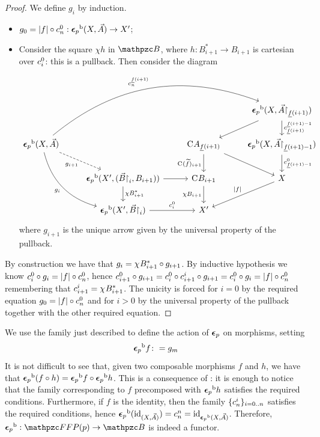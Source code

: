 \documentclass{lmcs} %
\theoremstyle{plain}\newtheorem{satz}[thm]{Satz} %
\begin{document}
			\begin{proof}
				We define $g_i$ by induction. 
				\begin{itemize}[align=left]
					\item[\emph{i=0:}] $g_0=|f|\circ c^{0}_{n}:{\boldsymbol{\epsilon}_p}^{\mathrm{b}}(X,\vec{A})\rightarrow X'$;
					\item[\emph{i+1:}] Consider the square $\chi h$ in $\ct{B}$, where $h:B_{i+1}^{*}\to B_{i+1}$ is cartesian over $c^{0}_{i}$: this is a pullback. Then consider the diagram
					\[\begin{tikzcd}
						&& {} & {\fb{\twont{\epsilon}_p}(X,\vec{A}\rstn_{\sp{f}(i+1)})} \\
						{\fb{\twont{\epsilon}_p}(X,\vec{A})} && {\comp{} A_{\sp{f}(i+1)}} & {\fb{\twont{\epsilon}_p}(X,\vec{A}\rstn_{\sp{f}(i+1)-1})} \\
						& {\fb{\twont{\epsilon}_p}(X',(\vec{B}\rstn_i,B_{i+1}))} & {\comp{} B_{i+1}} & X \\
						& {\fb{\twont{\epsilon}_p}(X',\vec{B}\rstn_i)} & {X'}
						\arrow[from=1-4, to=2-3]
						\arrow["{\C{\sp{f}(i+1)-1}{\sp{f}(i+1)}}", from=1-4, to=2-4]
						\arrow["{\C{\sp{f}(i+1)}{n}}", bend left, from=2-1, to=1-4]
						\arrow["g_{i+1}"', dashed, from=2-1, to=3-2]
						\arrow["g_i"', bend right, from=2-1, to=4-2]
						\arrow["{\comp{}(\tp{f})_{i+1}}"', from=2-3, to=3-3]
						\arrow[from=2-3, to=3-4]
						\arrow["{\C{0}{\sp{f}(i+1)-1}}", from=2-4, to=3-4]
						\arrow[from=3-2, to=3-3]
						\arrow["\chi B_{i+1}^*", from=3-2, to=4-2]
						\arrow["{\chi B_{i+1}}"', from=3-3, to=4-3]
						\arrow["{\fp{f}}"', from=3-4, to=4-3]
						\arrow["{\C{0}{i}}", from=4-2, to=4-3]
					\end{tikzcd}\]
					where $g_{i+1}$ is the unique arrow given by the universal property of the pullback. 
				\end{itemize}
				By construction we have that $g_i=\chi^{}B_{i+1}^*\circ g_{i+1}$. By inductive hypothesis we know $c^{0}_{i}\circ g_i=|f|\circ c^{0}_{n}$, hence $c^{0}_{i+1}\circ g_{i+1}=c^{0}_{i}\circ c^{i}_{i+1}\circ g_{i+1}=c^{0}_{i}\circ g_i=|f|\circ c^{0}_{n}$ remembering that $c^{i}_{i+1}=\chi^{}B_{i+1}^*$.
				The unicity is forced for $i=0$ by the required equation $g_0=|f|\circ c^{0}_{n}$ and for $i>0$ by the universal property of the pullback together with the other required equation.
			\end{proof}
			
We use the family just described to define the action of $\boldsymbol{\epsilon}_p$ on morphisms, setting 
\[ {\boldsymbol{\epsilon}_p}^{\mathrm{b}}f\colon = g_m \] 
It is not difficult to see that, 
given two composable morphisms $f$ and $h$, we have that ${\boldsymbol{\epsilon}_p}^{\mathrm{b}}(f\circ h)={\boldsymbol{\epsilon}_p}^{\mathrm{b}}f\circ {\boldsymbol{\epsilon}_p}^{\mathrm{b}}h$.
This is a consequence of : it is enough to notice that the family corresponding to $f$ precomposed with ${\boldsymbol{\epsilon}_p}^{\mathrm{b}}h$ satisfies the required conditions.	Furthermore, if $f$ is the identity, then the family $\{c^{i}_{n}\}_{i=0..n}$ satisfies the required conditions, hence ${\boldsymbol{\epsilon}_p}^{\mathrm{b}}(\mathrm{id}_{(X,\vec{A})})=c^{n}_{n}=\mathrm{id}_{{\boldsymbol{\epsilon}_p}^{\mathrm{b}}(X,\vec{A})}$.
Therefore, $\fb{\twont{\epsilon}_p}:\FFFP{p}\rightarrow \ct{B}$ is indeed a functor. 
\end{document}
